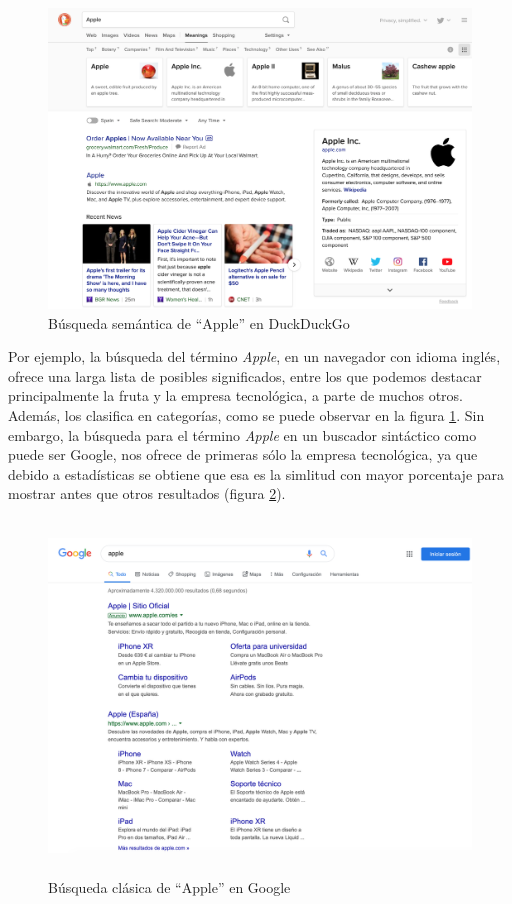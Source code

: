 \begin{figure}[H]
	\centering
	\includegraphics[height=9.cm]{imagenes/capitulo3/duck21}
	\caption{Búsqueda semántica de ``Apple'' en DuckDuckGo}
	\label{busqueda-semantica}
\end{figure}

Por ejemplo, la búsqueda del término \textit{Apple}, en un navegador con idioma inglés, ofrece una larga lista de posibles significados, entre los que podemos destacar principalmente la fruta y la empresa tecnológica, a parte de muchos otros. Además, los clasifica en categorías, como se puede observar en la figura \ref{busqueda-semantica}. Sin embargo, la búsqueda para el término \textit{Apple} en un buscador sintáctico como puede ser Google, nos ofrece de primeras sólo la empresa tecnológica, ya que debido a estadísticas se obtiene que esa es la simlitud con mayor porcentaje para mostrar antes que otros resultados (figura \ref{busqueda-sintactica}).

\begin{figure}[H]
	\centering
	\includegraphics[height=9.4cm]{imagenes/capitulo3/apple}
	\caption{Búsqueda clásica de ``Apple'' en Google}
	\label{busqueda-sintactica}
\end{figure}

